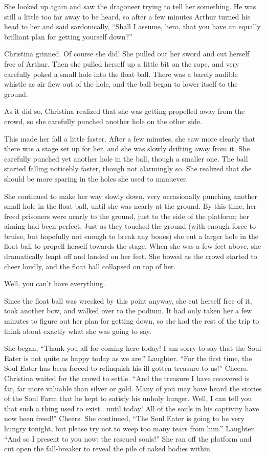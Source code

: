 \documentclass[showtrims,b6paper,draft,10pt]{memoir}
\begin{document}
She looked up again and saw the dragoneer trying to tell her something.  He was still a little too far away to be heard, so after a few minutes Arthur turned his head to her and said sardonically,  ``Shall I assume, hero, that you have an equally brilliant plan for getting yourself down?''

Christina grinned.  Of course she did!  She pulled out her sword and cut herself free of Arthur.  Then she pulled herself up a little bit on the rope, and very carefully poked a small hole into the float ball.  There was a barely audible whistle as air flew out of the hole, and the ball began to lower itself to the ground.

As it did so, Christina realized that she was getting propelled away from the crowd, so she carefully punched another hole on the other side.

This made her fall a little faster.  After a few minutes, she saw more clearly that there was a stage set up for her, and she was slowly drifting away from it.  She carefully punched yet another hole in the ball, though a smaller one.  The ball started falling noticebly faster, though not alarmingly so.  She realized that she should be more sparing in the holes she used to manuever.

She continued to make her way slowly down, very occasionally punching another small hole in the float ball, until she was nearly at the ground.  By this time, her freed prisoners were nearly to the ground, just to the side of the platform; her aiming had been perfect.  Just as they touched the ground (with enough force to bruise, but hopefully not enough to break any bones) she cut a larger hole in the float ball to propell herself towards the stage.  When she was a few feet above, she dramatically leapt off and landed on her feet.  She bowed as the crowd started to cheer loudly, and the float ball collapsed on top of her.

Well, you can't have everything.

Since the float ball was wrecked by this point anyway, she cut herself free of it, took another bow, and walked over to the podium.  It had only taken her a few minutes to figure out her plan for getting down, so she had the rest of the trip to think about exactly what she was going to say.

She began, ``Thank you all for coming here today!  I am sorry to say that the Soul Eater is not quite as happy today as we are.''  Laughter.  ``For the first time, the Soul Eater has been forced to relinquish his ill-gotten treasure to us!''  Cheers.  Christina waited for the crowd to settle.  ``And the treasure I have recovered is far, far more valuable than silver or gold.  Many of you may have heard the stories of the Soul Farm that he kept to satisfy his unholy hunger.  Well, I can tell you that such a thing used to exist.. until today!  All of the souls in  his captivity have now been freed!''  Cheers.  She continued, ``The Soul Eater is going to be very hungry tonight, but please try not to weep too many tears from him.''  Laughter.  ``And so I present to you now:  the rescued souls!''  She ran off the platform and cut open the fall-breaker to reveal the pile of naked bodies within.
\end{document}
